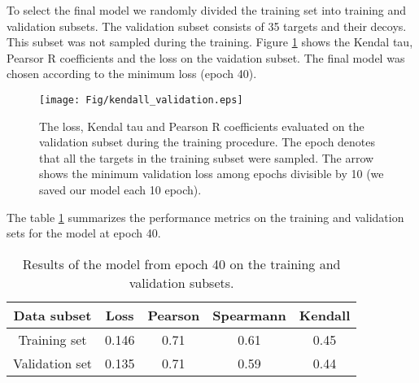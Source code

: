 To select the final model we randomly divided the training set into training and validation subsets. The validation subset consists of 
35 targets and their decoys. This subset was not sampled during the training. 
Figure \ref{Fig:TrainingLoss} shows the Kendal tau, Pearsor R coefficients and the loss on the vaidation subset. 
The final model was chosen according to the minimum loss (epoch 40).
\begin{figure}[H]
    \centering
    \texttt{[image: Fig/kendall\_validation.eps]}
    \caption{The loss, Kendal tau and Pearson R coefficients evaluated on the validation subset during the training procedure. 
    The epoch denotes that all the targets in the training subset were sampled. The arrow shows the minimum validation loss 
    among epochs divisible by 10 (we saved our model each 10 epoch).}
    \label{Fig:TrainingLoss}
\end{figure}

The table \ref{Tbl:TrainingResults} summarizes the performance metrics on the training and validation sets for the model at epoch 40.

\begin{table}[H]
\begin{center}
\begin{tabular}{ c | c | c | c | c }
    Data subset & Loss & Pearson & Spearmann & Kendall \\
    \hline
    Training set     &0.146 &0.71 &0.61 &0.45 \\
    Validation set   &0.135 &0.71 &0.59 &0.44 \\ \hline

\end{tabular}
  \caption {Results of the model from epoch 40 on the training and validation subsets.}
    \label{Tbl:TrainingResults}
\end{center}
\end{table}